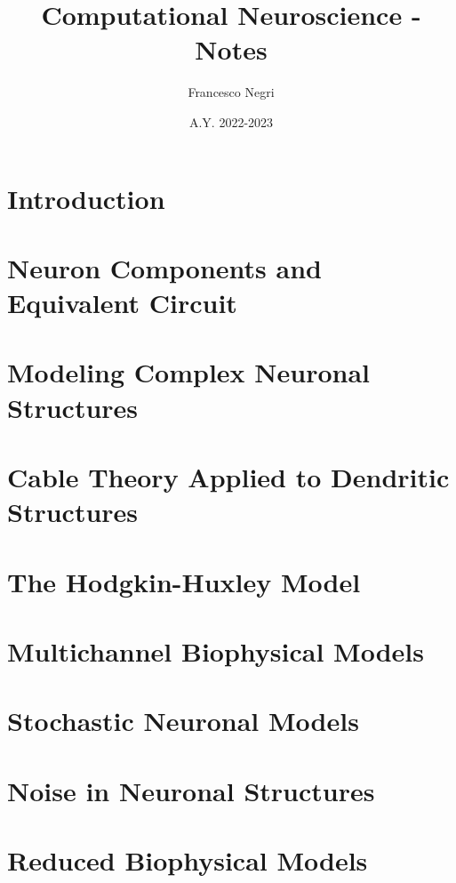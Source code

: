 \documentclass[12pt]{article}
\title{Computational Neuroscience - Notes}
\author{Francesco Negri}
\date{A.Y. 2022-2023}
\begin{document}
\maketitle

\tableofcontents
\newpage

\section{Introduction}
\graphicspath{ {./images/01/} }

\newpage

\section{Neuron Components and Equivalent Circuit}
\graphicspath{ {./images/02/} }

\newpage

\section{Modeling Complex Neuronal Structures}
\graphicspath{ {./images/03/} }

\newpage

\section{Cable Theory Applied to Dendritic Structures}
\graphicspath{ {./images/04/} }

\newpage

\section{The Hodgkin-Huxley Model}
\graphicspath{ {./images/05/} }

\newpage

\section{Multichannel Biophysical Models}
\graphicspath{ {./images/06/} }

\newpage

\section{Stochastic Neuronal Models}
\graphicspath{ {./images/07/} }

\newpage

\section{Noise in Neuronal Structures}
\graphicspath{ {./images/08/} }

\newpage

\section{Reduced Biophysical Models}
\graphicspath{ {./images/09/} }

\newpage
\end{document}
